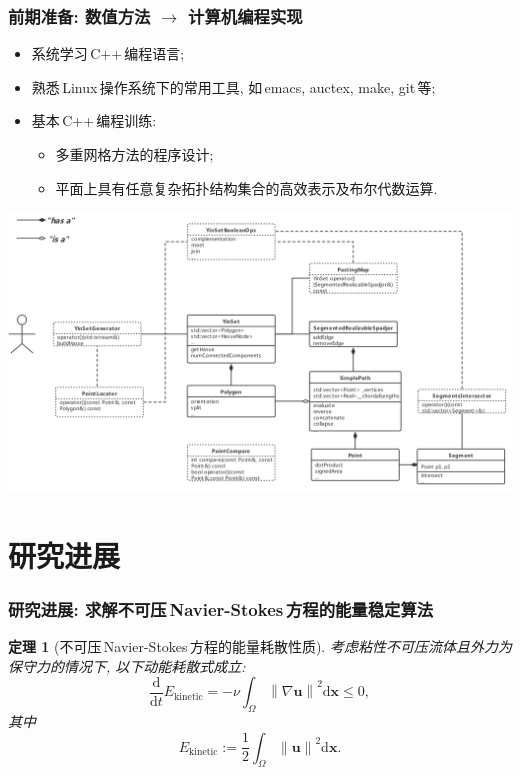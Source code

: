 \documentclass{beamer}
\newcommand{\dif}{\mathrm{d}}
\newtheorem{thm}{{定理}}
\begin{document}
\begin{CJK*}{UTF8}{gkai}
  \begin{frame}
    \frametitle{前期准备: 数值方法 $\rightarrow$ 计算机编程实现}
    \begin{itemize}
    \item
      系统学习\,C++\,编程语言;
    \item
      熟悉\,Linux\,操作系统下的常用工具,
      如\,emacs, auctex, make, git\,等;
    \item
      基本\,C++\,编程训练:
      \begin{itemize}
      \item
        多重网格方法的程序设计;
      \item
        平面上具有任意复杂拓扑结构集合的高效表示及布尔代数运算.
      \end{itemize}
    \end{itemize}
    \begin{center}
      \includegraphics[scale=0.24]{./png/uml}
    \end{center}
  \end{frame}
  
  \section{研究进展}
  \begin{frame}
    \frametitle{研究进展: 求解不可压\,Navier-Stokes\,方程的能量稳定算法}
    \begin{thm}[不可压\,Navier-Stokes\,方程的能量耗散性质]
      考虑粘性不可压流体且外力为保守力的情况下,
      以下动能耗散式成立:
      \begin{equation}
        \frac{\dif}{\dif t}E_{\text{kinetic}} = -\nu\int_{\Omega}\left\|  \nabla \bm{u}\right\|^2\dif \bm{x} \le 0,
      \end{equation}
      其中
      \begin{equation}
        E_{\text{kinetic}} := \frac{1}{2}\int_{\Omega} \left\|  \bm{u}\right\|^2\dif \bm{x}.
      \end{equation}
    \end{thm}


\end{frame}
\end{CJK*}
\end{document}
